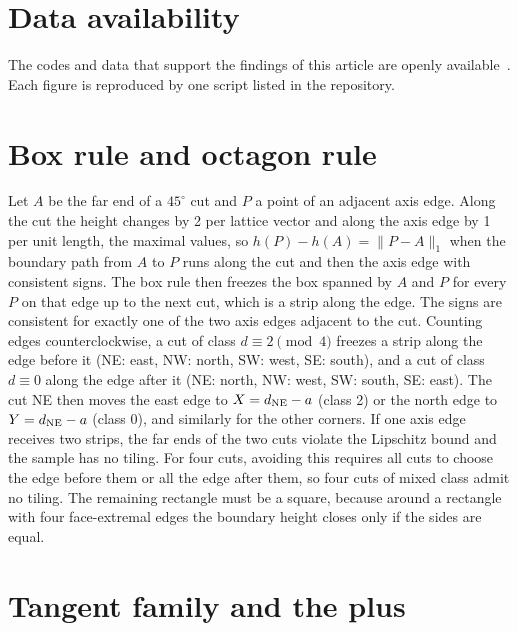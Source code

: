 \documentclass[reprint,aps,prb,floatfix,longbibliography,amsmath,amssymb]{revtex4-2}
\begin{document}
\section*{Data availability}
The codes and data that support the findings of this article are openly available~\cite{repo}. Each figure is reproduced by one script listed in the repository.

\appendix

\section{Box rule and octagon rule}\label{app:box}

Let $A$ be the far end of a $45^\circ$ cut and $P$ a point of an adjacent axis edge. Along the cut the height changes by 2 per lattice vector and along the axis edge by 1 per unit length, the maximal values, so $h(P)-h(A)=\|P-A\|_1$ when the boundary path from $A$ to $P$ runs along the cut and then the axis edge with consistent signs. The box rule then freezes the box spanned by $A$ and $P$ for every $P$ on that edge up to the next cut, which is a strip along the edge. The signs are consistent for exactly one of the two axis edges adjacent to the cut. Counting edges counterclockwise, a cut of class $d\equiv2\pmod4$ freezes a strip along the edge before it (NE: east, NW: north, SW: west, SE: south), and a cut of class $d\equiv0$ along the edge after it (NE: north, NW: west, SW: south, SE: east). The cut NE then moves the east edge to $X=d_{\rm NE}-a$ (class 2) or the north edge to $Y=d_{\rm NE}-a$ (class 0), and similarly for the other corners. If one axis edge receives two strips, the far ends of the two cuts violate the Lipschitz bound and the sample has no tiling. For four cuts, avoiding this requires all cuts to choose the edge before them or all the edge after them, so four cuts of mixed class admit no tiling. The remaining rectangle must be a square, because around a rectangle with four face-extremal edges the boundary height closes only if the sides are equal.

\section{Tangent family and the plus}\label{app:tangent}
\end{document}
